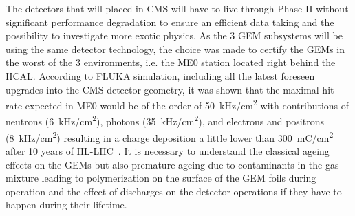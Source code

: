 	The detectors that will placed in CMS will have to live through Phase-II without significant performance degradation to ensure an efficient data taking and the possibility to investigate more exotic physics. As the 3 GEM subsystems will be using the same detector technology, the choice was made to certify the GEMs in the worst of the 3 environments, i.e. the ME0 station located right behind the HCAL. According to FLUKA simulation, including all the latest foreseen upgrades into the CMS detector geometry, it was shown that the maximal hit rate expected in ME0 would be of the order of \SI{50}{kHz/cm^2} with contributions of neutrons (\SI{6}{kHz/cm^2}), photons (\SI{35}{kHz/cm^2}), and electrons and positrons (\SI{8}{kHz/cm^2}) resulting in a charge deposition a little lower than \SI{300}{mC/cm^2} after 10 years of HL-LHC~\cite{PHASEIITP}. It is necessary to understand the classical ageing effects on the GEMs but also premature ageing due to contaminants in the gas mixture leading to polymerization on the surface of the GEM foils during operation and the effect of discharges on the detector operations if they have to happen during their lifetime.
	
